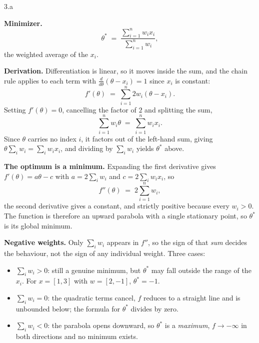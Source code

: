 \clearpage

\LARGE
3.a
\normalsize

\begin{answer}
  \textbf{Minimizer.}
  \[
    \theta^{*} \;=\; \frac{\sum_{i=1}^{n} w_i x_i}{\sum_{i=1}^{n} w_i},
  \]
  the weighted average of the $x_i$.

  \medskip
  \textbf{Derivation.} Differentiation is linear, so it moves inside the sum, and the chain rule
  applies to each term with $\frac{d}{d\theta}(\theta - x_i) = 1$ since $x_i$ is constant:
  \[
    f'(\theta) \;=\; \sum_{i=1}^{n} 2 w_i (\theta - x_i).
  \]
   Setting $f'(\theta) = 0$, cancelling the
  factor of $2$ and splitting the sum,
  \[
    \sum_{i=1}^{n} w_i \theta \;=\; \sum_{i=1}^{n} w_i x_i .
  \]
  Since $\theta$ carries no index $i$, it factors out of the left-hand sum, giving
  $\theta \sum_i w_i = \sum_i w_i x_i$, and dividing by $\sum_i w_i$ yields $\theta^{*}$ above.

  \medskip
  \textbf{The optimum is a minimum.} Expanding the first derivative gives
  $f'(\theta) = a\theta - c$ with $a = 2\sum_i w_i$ and $c = 2\sum_i w_i x_i$, so
  \[
    f''(\theta) \;=\; 2\sum_{i=1}^{n} w_i,
  \]
 the second derivative gives a constant, and strictly positive because every $w_i > 0$. The function is therefore an
  upward parabola with a single stationary point, so $\theta^{*}$ is its global minimum.

  \medskip
  \textbf{Negative weights.} Only $\sum_i w_i$ appears in $f''$, so the sign of that
  \emph{sum} decides the behaviour, not the sign of any individual weight. Three cases:
  \begin{itemize}
    \item $\sum_i w_i > 0$: still a genuine minimum, but $\theta^{*}$ may fall outside the
      range of the $x_i$. For $x = [1, 3]$ with $w = [2, -1]$, $\theta^{*} = -1$.
    \item $\sum_i w_i = 0$: the quadratic terms cancel, $f$ reduces to a straight line and is
      unbounded below; the formula for $\theta^{*}$ divides by zero.
    \item $\sum_i w_i < 0$: the parabola opens downward, so $\theta^{*}$ is a \emph{maximum},
      $f \to -\infty$ in both directions and no minimum exists.
  \end{itemize}
\end{answer}

